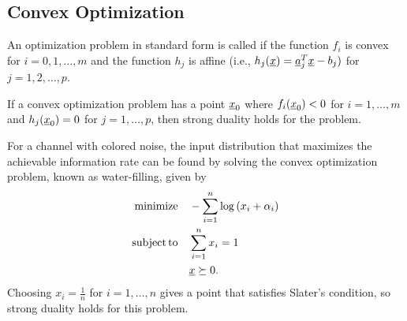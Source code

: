 \subsection{Convex Optimization}

\begin{definition}
An optimization problem in standard form is called  if the function $f_i$ is convex for $i=0,1,\ldots,m$ and the function $h_j$ is affine (i.e., $h_j(\underline{x}) = \underline{a}_j^T \underline{x} - b_j)$ for $j=1,2,\ldots,p$.
\end{definition}

\begin{theorem}
If a convex optimization problem has a point $\underline{x}_0$ where $f_i(\underline{x}_0) < 0$ for $i=1,\ldots,m$ and $h_j (\underline{x}_0) = 0$ for $j=1,\ldots,p$, then strong duality holds for the problem.
\end{theorem}

\begin{example}
For a channel with colored noise, the input distribution that maximizes the achievable information rate can be found by solving the convex optimization problem, known as water-filling, given by
\begin{align*}
\mathrm{minimize} \quad & -\sum_{i=1}^n \log \left( x_i + \alpha_i \right) \\
\mathrm{subject\,to} \quad & \sum_{i=1}^n x_i = 1 \\
& \underline{x} \succeq 0.
\end{align*}
Choosing $x_i = \frac{1}{n}$ for $i=1,\ldots,n$ gives a point that satisfies Slater's condition, so strong duality holds for this problem.
\end{example}

